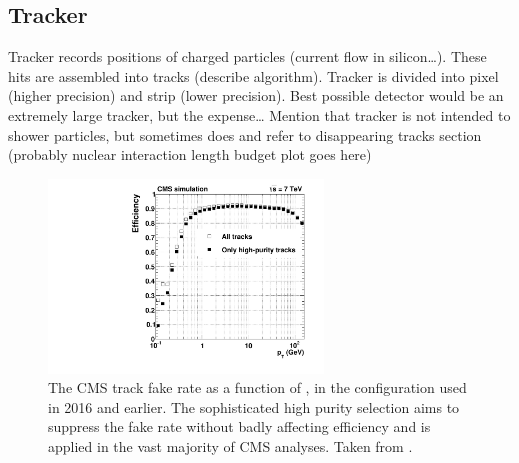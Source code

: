   \subsection{Tracker} \label{sec:tracker}

  Tracker records positions of charged particles (current flow in silicon\ldots).
  These hits are assembled into tracks (describe algorithm). 
  Tracker is divided into pixel (higher precision) and strip (lower precision).
  Best possible detector would be an extremely large tracker, but the expense\ldots
  Mention that tracker is not intended to shower particles, but sometimes does and refer to disappearing tracks section (probably nuclear interaction length budget plot goes here)

  \begin{figure}[h!]
    \centering
    \includegraphics[width=0.65\textwidth]{figures/efficiencyVsPt.pdf}
    \caption[Track fake rate.]{
      The CMS track fake rate as a function of \pt, in the configuration used in 2016 and earlier. 
      The sophisticated high purity selection aims to suppress the fake rate without badly affecting efficiency and is applied in the vast majority of CMS analyses. 
      Taken from \cite{cmstracking}.}
    \label{fig:trackfakerate}
  \end{figure}  

